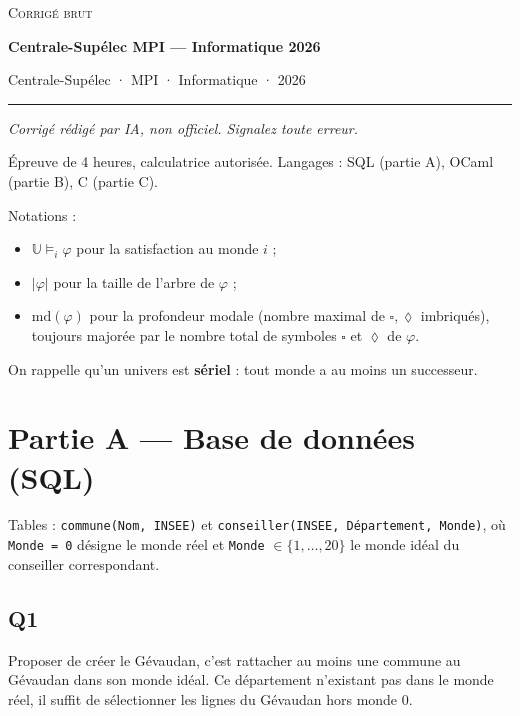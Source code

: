 \documentclass[11pt,a4paper]{article}
\providecommand{\tightlist}{\setlength{\itemsep}{0pt}\setlength{\parskip}{0pt}}
\providecommand{\Box}{\square}
\providecommand{\Diamond}{\lozenge}
\begin{document}
\thispagestyle{plain}
\begin{center}
  {\small\scshape Corrigé brut}\par\smallskip
  {\LARGE\bfseries Centrale-Supélec MPI — Informatique 2026\par}\medskip
  {\large Centrale-Supélec · MPI · Informatique · 2026\par}
\end{center}
\vspace{2pt}\hrule\vspace{8pt}

\emph{Corrigé rédigé par IA, non officiel. Signalez toute erreur.}

Épreuve de 4 heures, calculatrice autorisée. Langages : SQL (partie A), OCaml (partie B), C (partie C).

Notations :

\begin{itemize}
\tightlist
\item
  \(\mathbb U\models_i\varphi\) pour la satisfaction au monde \(i\) ;
\item
  \(|\varphi|\) pour la taille de l'arbre de \(\varphi\) ;
\item
  \(\mathrm{md}(\varphi)\) pour la profondeur modale (nombre maximal de \(\Box,\Diamond\) imbriqués), toujours majorée par le nombre total de symboles \(\Box\) et \(\Diamond\) de \(\varphi\).
\end{itemize}

On rappelle qu'un univers est \textbf{sériel} : tout monde a au moins un successeur.

\hypertarget{partie-a-base-de-donnuxe9es-sql}{%
\section{Partie A --- Base de données (SQL)}\label{partie-a-base-de-donnuxe9es-sql}}

Tables : \texttt{commune(\allowbreak{}Nom,\allowbreak{}\ INSEE)\allowbreak{}} et \texttt{conseiller(\allowbreak{}INSEE,\allowbreak{}\ Département,\allowbreak{}\ Monde)\allowbreak{}}, où \texttt{Monde\ =\ 0} désigne le monde réel et \texttt{Monde} \(\in\{1,\dots,20\}\) le monde idéal du conseiller correspondant.

\hypertarget{q1}{%
\subsection{Q1}\label{q1}}

Proposer de créer le Gévaudan, c'est rattacher au moins une commune au Gévaudan dans son monde idéal. Ce département n'existant pas dans le monde réel, il suffit de sélectionner les lignes du Gévaudan hors monde 0.
\end{document}
